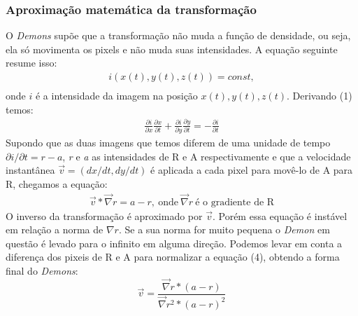 \subsubsection{Aproximação matemática da transformação}
    O \textit{Demons} supõe que a transformação não muda a função de densidade, ou seja, ela só movimenta os pixels e não muda
suas intensidades. A equação seguinte resume isso:
\begin{align}
    i(x(t),y(t),z(t)) = const, \\
\end{align}
    onde $i$ é a intensidade da imagem na posição $x(t),y(t),z(t)$. Derivando (1) temos:
\begin{align}
    \frac{\partial i}{\partial x} \frac{\partial x}{\partial t} +
    \frac{\partial i}{\partial y} \frac{\partial y}{\partial t} = - \frac{\partial i}{\partial t}
\end{align}
    Supondo que as duas imagens que temos diferem de uma unidade de tempo $\partial i/\partial t = 
r-a$, \textit{r} e \textit{a} as intensidades de R e A respectivamente e que a velocidade instantânea 
$\vec{v} = (dx/dt,dy/dt)$ é aplicada a cada pixel para movê-lo de A para R, chegamos a equação:
\begin{align}
    \vec{v}*\vec{\nabla}r = a - r, \ \text{onde} \ \vec{\nabla} r \ \text{é o gradiente de R}
\end{align}
    O inverso da transformação é aproximado por $\vec{v}$. Porém essa equação é instável em relação a norma de $\nabla 
r$. Se a sua norma for muito pequena o \textit{Demon} em questão é levado para o infinito em alguma direção. Podemos levar em 
conta a diferença dos pixeis de R e A para normalizar a equação (4), obtendo a forma final do \textit{Demons}:
\begin{equation}
    \vec{v} = \frac{\vec{\nabla}r * (a - r)}{\vec{\nabla}r^2 * (a - r)^2}
\end{equation}

